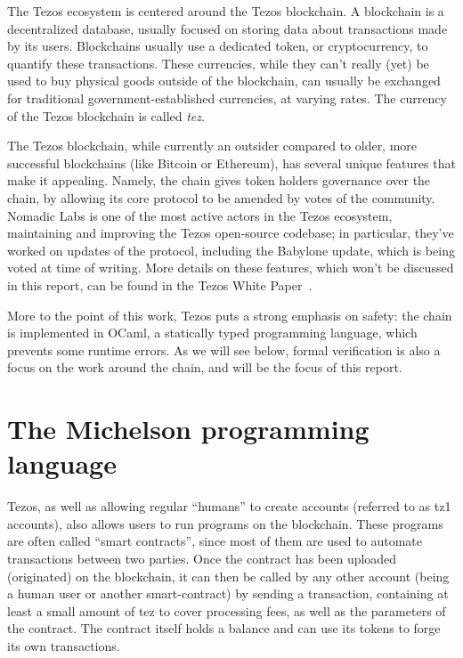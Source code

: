 \documentclass{report}
\begin{document}
The Tezos ecosystem is centered around the Tezos blockchain. A blockchain is a decentralized database, usually focused on storing data about transactions made by its users. Blockchains usually use a dedicated token, or cryptocurrency, to quantify these transactions. These currencies, while they can't really (yet) be used to buy physical goods outside of the blockchain, can usually be exchanged for traditional government-established currencies, at varying rates. The currency of the Tezos blockchain is called \emph{tez}.

The Tezos blockchain, while currently an outsider compared to older, more successful blockchains (like Bitcoin or Ethereum), has several unique features that make it appealing. Namely, the chain gives token holders governance over the chain, by allowing its core protocol to be amended by votes of the community. Nomadic Labs is one of the most active actors in the Tezos ecosystem, maintaining and improving the Tezos open-source codebase; in particular, they've worked on updates of the protocol, including the Babylone update, which is being voted at time of writing. More details on these features, which won't be discussed in this report, can be found in the Tezos White Paper~\cite{whitePaper}.

More to the point of this work, Tezos puts a strong emphasis on safety: the chain is implemented in OCaml, a statically typed programming language, which prevents some runtime errors. As we will see below, formal verification is also a focus on the work around the chain, and will be the focus of this report.

\section{The Michelson programming language}

Tezos, as well as allowing regular ``humans'' to create accounts (referred to as tz1 accounts), also allows users to run programs on the blockchain. These programs are often called ``smart contracts'', since most of them are used to automate transactions between two parties. Once the contract has been uploaded (originated) on the blockchain, it can then be called by any other account (being a human user or another smart-contract) by sending a transaction, containing at least a small amount of tez to cover processing fees, as well as the parameters of the contract. The contract itself holds a balance and can use its tokens to forge its own transactions.
\end{document}
